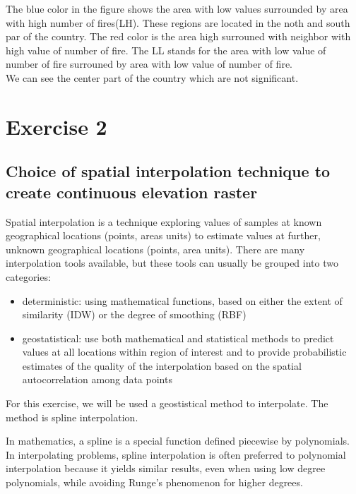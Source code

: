 \documentclass[11pt,a4paper]{article}
\begin{document}
    
    The blue color in the figure shows the area  with low values surrounded by area with high number of fires(LH). These regions are located in the noth and south par of the country. The red color is the area high surrouned with neighbor with high value of number of fire. The LL stands for the area with low value of number of fire surrouned by area with low value of number of fire. \\
    We can see the center part of the country which are not significant.
    
\hypertarget{exercise-2}{%
\section{Exercise 2}\label{exercise-2}}
   
    \hypertarget{spline-interpolation}{%
\subsection{Choice of spatial interpolation technique to create continuous elevation raster}\label{spline-interpolation}}
Spatial interpolation is a technique exploring values of samples at known geographical locations
(points, areas units) to estimate values at further, unknown geographical
locations (points, area units). There are many interpolation tools available, but these tools can usually be grouped into two categories: 
	
	
\begin{itemize}
  \item deterministic: using mathematical functions, based on either the extent of similarity (IDW) or the degree of smoothing (RBF)
  \item geostatistical: use both mathematical and statistical methods to predict values at all locations within region of interest and to provide probabilistic estimates of the quality of the interpolation based on the spatial autocorrelation among data points
\end{itemize}

For this exercise, we will be used a geostistical method to interpolate. The method is spline interpolation.
    	
	In mathematics, a spline is a special function defined piecewise by polynomials. In interpolating problems, spline interpolation is often preferred to polynomial interpolation because it yields similar results, even when using low degree polynomials, while avoiding Runge's phenomenon for higher degrees.\cite{spline}
\end{document}
